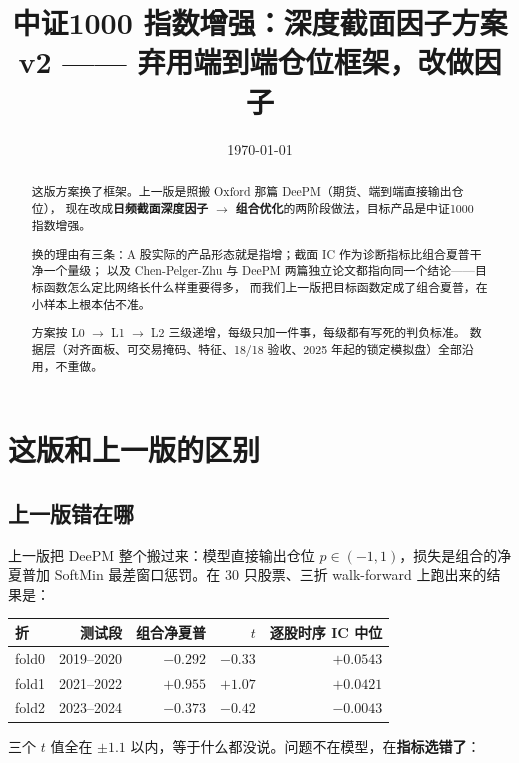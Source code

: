 \documentclass[11pt, a4paper]{ctexart}
\title{\bfseries 中证1000 指数增强：深度截面因子方案\\[4pt] \large v2 —— 弃用端到端仓位框架，改做因子}
\author{}
\date{\today}
\begin{document}
\maketitle
\thispagestyle{fancy}

\begin{abstract}
\noindent
这版方案换了框架。上一版是照搬 Oxford 那篇 DeePM（期货、端到端直接输出仓位），
现在改成\textbf{日频截面深度因子 $\to$ 组合优化}的两阶段做法，目标产品是中证1000 指数增强。

换的理由有三条：A 股实际的产品形态就是指增；截面 IC 作为诊断指标比组合夏普干净一个量级；
以及 Chen-Pelger-Zhu 与 DeePM 两篇独立论文都指向同一个结论——目标函数怎么定比网络长什么样重要得多，
而我们上一版把目标函数定成了组合夏普，在小样本上根本估不准。

方案按 L0 $\to$ L1 $\to$ L2 三级递增，每级只加一件事，每级都有写死的判负标准。
数据层（对齐面板、可交易掩码、特征、18/18 验收、2025 年起的锁定模拟盘）全部沿用，不重做。
\end{abstract}

\tableofcontents
\bigskip

\section{这版和上一版的区别}

\subsection{上一版错在哪}

上一版把 DeePM 整个搬过来：模型直接输出仓位 $p\in(-1,1)$，损失是组合的净夏普加 SoftMin
最差窗口惩罚。在 30 只股票、三折 walk-forward 上跑出来的结果是：

\begin{center}
\small
\begin{tabular}{lrrrr}
\toprule
折 & 测试段 & 组合净夏普 & $t$ & 逐股时序 IC 中位 \\
\midrule
fold0 & 2019--2020 & $-0.292$ & $-0.33$ & $+0.0543$ \\
fold1 & 2021--2022 & $+0.955$ & $+1.07$ & $+0.0421$ \\
fold2 & 2023--2024 & $-0.373$ & $-0.42$ & $-0.0043$ \\
\bottomrule
\end{tabular}
\end{center}

三个 $t$ 值全在 $\pm 1.1$ 以内，等于什么都没说。问题不在模型，在\textbf{指标选错了}：
\end{document}
